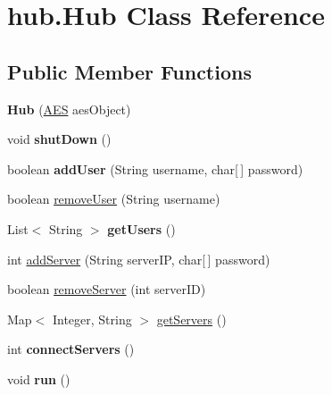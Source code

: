 \hypertarget{classhub_1_1_hub}{
\section{hub.\-Hub \-Class \-Reference}
\label{classhub_1_1_hub}
}
\subsection*{\-Public \-Member \-Functions}
\begin{DoxyCompactItemize}
\item 
\hypertarget{classhub_1_1_hub_a67d72eec37fce8e6009b9596681e0339}{
{\bfseries \-Hub} (\hyperlink{classsecurity_1_1_a_e_s}{\-A\-E\-S} aes\-Object)}
\label{classhub_1_1_hub_a67d72eec37fce8e6009b9596681e0339}

\item 
\hypertarget{classhub_1_1_hub_a6c9ff2050ce79ded47178782cd31a024}{
void {\bfseries shut\-Down} ()}
\label{classhub_1_1_hub_a6c9ff2050ce79ded47178782cd31a024}

\item 
\hypertarget{classhub_1_1_hub_a026f24f6853b5758ef0d0d1503fd1ede}{
boolean {\bfseries add\-User} (\-String username, char\mbox{[}$\,$\mbox{]} password)}
\label{classhub_1_1_hub_a026f24f6853b5758ef0d0d1503fd1ede}

\item 
boolean \hyperlink{classhub_1_1_hub_aed40797f9126b304044b9a39140a72d2}{remove\-User} (\-String username)
\item 
\hypertarget{classhub_1_1_hub_a7e4feced4bdc0707e4e72d3ea200c040}{
\-List$<$ \-String $>$ {\bfseries get\-Users} ()}
\label{classhub_1_1_hub_a7e4feced4bdc0707e4e72d3ea200c040}

\item 
int \hyperlink{classhub_1_1_hub_afe7de14a910f249e0c720d8c12c6afbc}{add\-Server} (\-String server\-I\-P, char\mbox{[}$\,$\mbox{]} password)
\item 
boolean \hyperlink{classhub_1_1_hub_a19396f2761a541a5f01e91a89fc1ed9a}{remove\-Server} (int server\-I\-D)
\item 
\-Map$<$ \-Integer, \-String $>$ \hyperlink{classhub_1_1_hub_abb4bffbccc15975a44606e672accc19a}{get\-Servers} ()
\item 
\hypertarget{classhub_1_1_hub_a459061ec18f81545652d9110c733a4a0}{
int {\bfseries connect\-Servers} ()}
\label{classhub_1_1_hub_a459061ec18f81545652d9110c733a4a0}

\item 
\hypertarget{classhub_1_1_hub_aa5db9de0922bdf2d5057c7441979f957}{
void {\bfseries run} ()}
\label{classhub_1_1_hub_aa5db9de0922bdf2d5057c7441979f957}

\end{DoxyCompactItemize}
